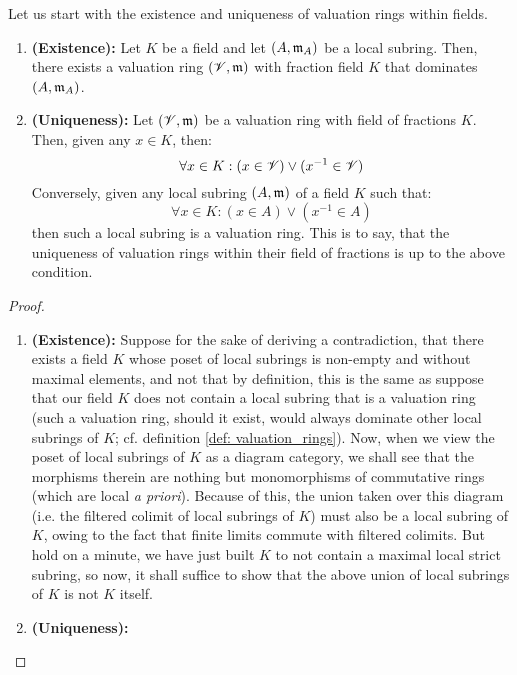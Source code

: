             Let us start with the existence and uniqueness of valuation rings within fields. 
            \begin{lemma} \label{lemma: valuation_rings_existence_and_uniqueness}
                \noindent
                \begin{enumerate}
                    \item \textbf{(Existence):} Let $K$ be a field and let $(A, \mathfrak{m}_A)$ be a local subring. Then, there exists a valuation ring $(\mathscr{V}, \mathfrak{m})$ with fraction field $K$ that dominates $(A, \mathfrak{m}_A)$.
                    \item \textbf{(Uniqueness):} Let $(\mathscr{V}, \mathfrak{m})$ be a valuation ring with field of fractions $K$. Then, given any $x \in K$, then:
                        $$\forall x \in K: (x \in \mathscr{V}) \vee (x^{-1} \in \mathscr{V})$$
                    Conversely, given any local subring $(A, \mathfrak{m})$ of a field $K$ such that:
                        $$\forall x \in K: (x \in A) \vee (x^{-1} \in A)$$
                    then such a local subring is a valuation ring. This is to say, that the uniqueness of valuation rings within their field of fractions is up to the above condition.
                \end{enumerate}
            \end{lemma}
                \begin{proof}
                    \noindent
                    \begin{enumerate}
                        \item \textbf{(Existence):} Suppose for the sake of deriving a contradiction, that there exists a field $K$ whose poset of local subrings is non-empty and without maximal elements, and not that by definition, this is the same as suppose that our field $K$ does not contain a local subring that is a valuation ring (such a valuation ring, should it exist, would always dominate other local subrings of $K$; cf. definition \ref{def: valuation_rings}). Now, when we view the poset of local subrings of $K$ as a diagram category, we shall see that the morphisms therein are nothing but monomorphisms of commutative rings (which are local \textit{a priori}). Because of this, the union taken over this diagram (i.e. the filtered colimit of local subrings of $K$) must also be a local subring of $K$, owing to the fact that finite limits commute with filtered colimits. But hold on a minute, we have just built $K$ to not contain a maximal local strict subring, so now, it shall suffice to show that the above union of local subrings of $K$ is not $K$ itself.
                        \item \textbf{(Uniqueness):}
                    \end{enumerate}
                \end{proof}
                

